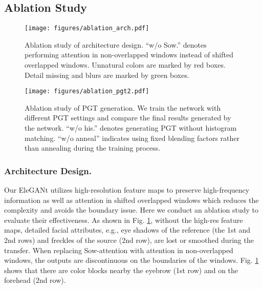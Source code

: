 \subsection{Ablation Study}
\label{sec:ablation}
\begin{figure}[t]
    \setlength{\abovecaptionskip}{-0.1cm}
    \setlength{\belowcaptionskip}{0.1cm}
    \centering
    \texttt{[image: figures/ablation\_arch.pdf]}
    \caption{Ablation study of architecture design. ``w/o Sow.'' denotes performing attention in non-overlapped windows instead of shifted overlapped windows. Unnatural colors are marked by red boxes. Detail missing and blurs are marked by green boxes.}
    \label{fig-abla-arch}
\end{figure}
\begin{figure}[t]
    \setlength{\abovecaptionskip}{0.1cm}
    \setlength{\belowcaptionskip}{-0.2cm}
    \centering
    \texttt{[image: figures/ablation\_pgt2.pdf]}
    \caption{Ablation study of PGT generation. We train the network with different PGT settings and compare the final results generated by the network. ``w/o his.'' denotes generating PGT without histogram matching. ``w/o anneal'' indicates using fixed blending factors rather than annealing during the training process.}
    \label{fig-abla-pgt}
\end{figure}

\subsubsection{Architecture Design.} 
Our EleGANt utilizes high-resolution feature maps to preserve high-frequency information as well as attention in shifted overlapped windows which reduces the complexity and avoids the boundary issue. Here we conduct an ablation study to evaluate their effectiveness. As shown in Fig. \ref{fig-abla-arch}, without the high-res feature maps, detailed facial attributes, e.g., eye shadows of the reference (the 1st and 2nd rows) and freckles of the source (2nd row), are lost or smoothed during the transfer. When replacing Sow-attention with attention in non-overlapped windows, the outputs are discontinuous on the boundaries of the windows. Fig. \ref{fig-abla-arch} shows that there are color blocks nearby the eyebrow (1st row) and on the forehead (2nd row). 

